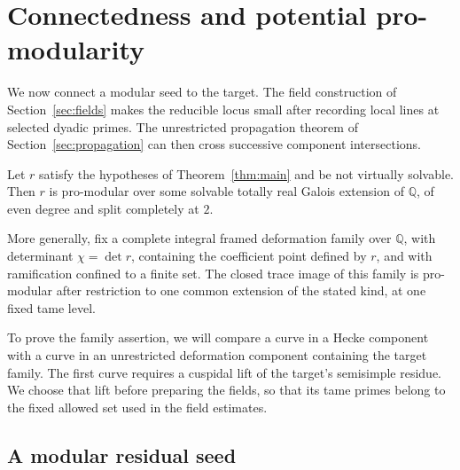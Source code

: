 \section{Connectedness and potential pro-modularity}
\label{sec:connectedness}

We now connect a modular seed to the target. The field
construction of Section~\ref{sec:fields} makes the reducible
locus small after recording local lines at selected dyadic
primes. The unrestricted propagation theorem of
Section~\ref{sec:propagation} can then cross successive
component intersections.

\begin{theorem}\label{thm:potential-promodularity}
Let \(r\) satisfy the hypotheses of Theorem~\ref{thm:main} and be not
virtually solvable. Then \(r\) is pro-modular over
some solvable totally real Galois extension of
\(\mathbb Q\), of even degree and split completely
at \(2\).

More generally, fix a complete integral framed deformation family over
\(\mathbb Q\), with determinant \(\chi=\det r\), containing the
coefficient point defined by \(r\), and with ramification confined
to a finite set. The closed trace image of this family is pro-modular
after restriction to one common extension of the stated kind, at
one fixed tame level.
\end{theorem}

To prove the family assertion, we will compare a curve in a Hecke
component with a curve in an unrestricted deformation component
containing the target family. The first curve requires a cuspidal
lift of the target's semisimple residue. We choose that lift before
preparing the fields, so that its tame primes belong to the fixed
allowed set used in the field estimates.

\subsection{A modular residual seed}

